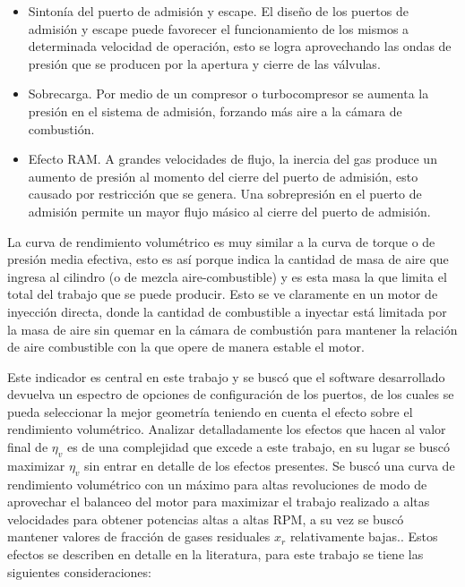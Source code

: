 \begin{itemize}
    \item Sintonía del puerto de admisión y escape.
        El diseño de los puertos de admisión y escape puede favorecer el
        funcionamiento de los mismos a determinada velocidad de operación, esto
        se logra aprovechando las ondas de presión que se producen por la
        apertura y cierre de las válvulas.
    \item Sobrecarga.
        Por medio de un compresor o turbocompresor se aumenta la presión en el
        sistema de admisión, forzando más aire a la cámara de combustión.
    \item Efecto RAM.
        A grandes velocidades de flujo, la inercia del gas produce un aumento
        de presión al momento del cierre del puerto de admisión, esto causado
        por restricción que se genera. Una sobrepresión en el puerto de
        admisión permite un mayor flujo másico al cierre del puerto de
        admisión.
\end{itemize}

La curva de rendimiento volumétrico es muy similar a la curva de torque o de
presión media efectiva, esto es así porque indica la cantidad de masa de aire
que ingresa al cilindro (o de mezcla aire-combustible) y es esta masa la que
limita el total del trabajo que se puede producir.
%
Esto se ve claramente en un motor de inyección directa, donde la cantidad de
combustible a inyectar está limitada por la masa de aire sin quemar en la
cámara de combustión para mantener la relación de aire combustible con la que
opere de manera estable el motor.


Este indicador es central en este trabajo y se buscó que el software
desarrollado devuelva un espectro de opciones de configuración de los puertos,
de los cuales se pueda seleccionar la mejor geometría teniendo en cuenta el
efecto sobre el rendimiento volumétrico.
%
Analizar detalladamente los efectos que hacen al valor final de $\eta_v$ es de
una complejidad que excede a este trabajo, en su lugar se buscó maximizar
$\eta_v$ sin entrar en detalle de los efectos presentes.
%
Se buscó una curva de rendimiento volumétrico con un máximo para altas
revoluciones de modo de aprovechar el balanceo del motor para maximizar el trabajo
realizado a altas velocidades para obtener potencias altas a altas RPM, a su vez
se buscó mantener valores de fracción de gases residuales $x_r$ relativamente
bajas..
%
Estos efectos se describen en detalle en la literatura\parencite{heywood}, para
este trabajo se tiene las siguientes consideraciones: 

